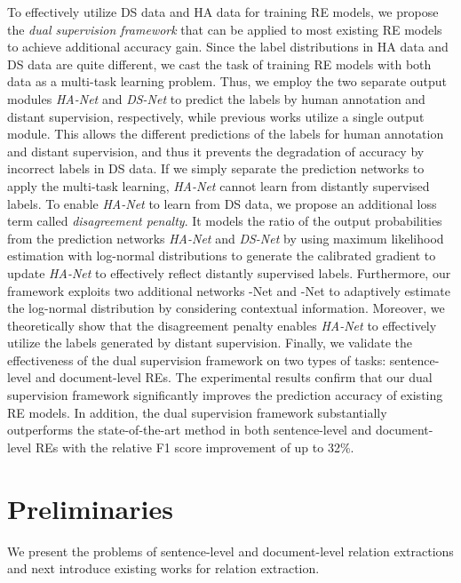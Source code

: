 \documentclass[11pt]{article}
\newcommand{\hanet}{\emph{HA-Net}\xspace}
\newcommand{\dsnet}{\emph{DS-Net}\xspace}
\newcommand{\munet}{-Net\xspace}
\newcommand{\sigmanet}{-Net\xspace}
\begin{document}
To effectively utilize DS data and HA data for training RE models, we propose the \emph{dual supervision framework} that can be applied to most existing RE models to achieve additional accuracy gain.
Since the label distributions in HA data and DS data are quite different, we cast the task of training RE models with both data as a multi-task learning problem.
Thus, we employ the two separate output modules \hanet and \dsnet to predict the labels by human annotation and distant supervision, respectively, while previous works utilize a single output module.
This allows the different predictions of the labels for human annotation and distant supervision, and thus it prevents the degradation of accuracy by incorrect labels in DS data.
If we simply separate the prediction networks to apply the multi-task learning, \hanet cannot learn from distantly supervised labels.
To enable \hanet to learn from DS data, we propose an additional loss term called \emph{disagreement penalty}.
It models the ratio of the output probabilities from the prediction networks \hanet and \dsnet by using maximum likelihood estimation with log-normal distributions to generate the calibrated gradient to update \hanet to effectively reflect distantly supervised labels. 
Furthermore, our framework exploits two additional networks \munet and \sigmanet to adaptively estimate the log-normal distribution by considering contextual information.
Moreover, we theoretically show that the disagreement penalty enables \hanet to effectively utilize the labels generated by distant supervision.
Finally, we validate the effectiveness of the dual supervision framework on two types of tasks: sentence-level and document-level REs.
The experimental results confirm that our dual supervision framework significantly improves the prediction accuracy of existing RE models. 
In addition, the dual supervision framework substantially outperforms the state-of-the-art method \cite{ye2019looking} in both sentence-level and document-level REs with the relative F1 score improvement of up to 32\%.





















 \section{Preliminaries}
\label{sec:preliminaries}
We present the problems of sentence-level and document-level relation extractions and next introduce existing works for relation extraction.
\end{document}
